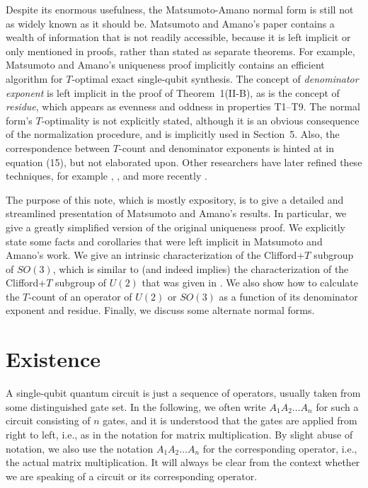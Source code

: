 \documentclass{article}
\begin{document}
Despite its enormous usefulness, the Matsumoto-Amano normal form is
still not as widely known as it should be. Matsumoto and Amano's paper
contains a wealth of information that is not readily accessible,
because it is left implicit or only mentioned in proofs, rather than
stated as separate theorems. For example, Matsumoto and Amano's
uniqueness proof implicitly contains an efficient algorithm for
$T$-optimal exact single-qubit synthesis. The concept of {\em
  denominator exponent} is left implicit in the proof of
Theorem~1(II-B), as is the concept of {\em residue}, which appears as
evenness and oddness in properties T1--T9. The normal form's
$T$-optimality is not explicitly stated, although it is an obvious
consequence of the normalization procedure, and is implicitly used in
Section~5.  Also, the correspondence between $T$-count and
denominator exponents is hinted at in equation (15), but not
elaborated upon. Other researchers have later refined these
techniques, for example {\cite{Kliuchnikov-etal}}, {\cite{BS}}, and
more recently {\cite[Section 4]{Gosset-etal}}.

The purpose of this note, which is mostly expository, is to give a
detailed and streamlined presentation of Matsumoto and Amano's
results. In particular, we give a greatly simplified version of the
original uniqueness proof. We explicitly state some facts and
corollaries that were left implicit in Matsumoto and Amano's work.  We
give an intrinsic characterization of the Clifford+$T$ subgroup of
$SO(3)$, which is similar to (and indeed implies) the characterization
of the Clifford+$T$ subgroup of $U(2)$ that was given in
{\cite{Kliuchnikov-etal}}. We also show how to calculate the $T$-count
of an operator of $U(2)$ or $SO(3)$ as a function of its denominator
exponent and residue. Finally, we discuss some alternate normal forms.

\section{Existence}

A single-qubit quantum circuit is just a sequence of operators,
usually taken from some distinguished gate set. In the following, we
often write $A_1A_2\ldots A_n$ for such a circuit consisting of $n$
gates, and it is understood that the gates are applied from right to
left, i.e., as in the notation for matrix multiplication. By slight
abuse of notation, we also use the notation $A_1A_2\ldots A_n$ for the
corresponding operator, i.e., the actual matrix multiplication. It
will always be clear from the context whether we are speaking of a
circuit or its corresponding operator.
\end{document}
